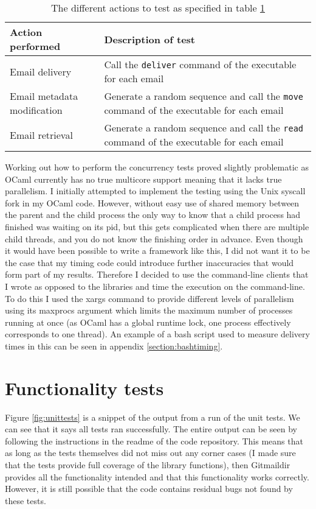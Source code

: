 \begin{table}[h]
\footnotesize
\centering
\begin{tabular}{p{4cm} p{10.5cm}}
  \toprule
  Action performed & Description of test \\
  \midrule
  Email delivery & Call the \texttt{deliver} command of the executable for each email \\
  Email metadata modification & Generate a random sequence and call the \texttt{move} command of the executable for each email \\
  Email retrieval & Generate a random sequence and call the \texttt{read} command of the executable for each email \\
  \bottomrule
\end{tabular}
\caption{The different actions to test as specified in table \ref{table:actions}}
\label{table:actions}
\end{table}

Working out how to perform the concurrency tests proved slightly problematic as OCaml currently has no true multicore support meaning that it lacks true parallelism. I initially attempted to implement the testing using the Unix syscall fork in my OCaml code. However, without easy use of shared memory between the parent and the child process the only way to know that a child process had finished was waiting on its pid, but this gets complicated when there are multiple child threads, and you do not know the finishing order in advance. Even though it would have been possible to write a framework like this, I did not want it to be the case that my timing code could introduce further inaccuracies that would form part of my results. Therefore I decided to use the command-line clients that I wrote as opposed to the libraries and time the execution on the command-line. To do this I used the xargs command to provide different levels of parallelism using its maxprocs argument which limits the maximum number of processes running at once (as OCaml has a global runtime lock, one process effectively corresponds to one thread). An example of a bash script used to measure delivery times in this can be seen in appendix \ref{section:bashtiming}.

\section{Functionality tests} \label{section:functionality_tests}

Figure \ref{fig:unittests} is a snippet of the output from a run of the unit tests. We can see that it says all tests ran successfully. The entire output can be seen by following the instructions in the readme of the code repository. This means that as long as the tests themselves did not miss out any corner cases (I made sure that the tests provide full coverage of the library functions), then Gitmaildir provides all the functionality intended and that this functionality works correctly. However, it is still possible that the code contains residual bugs not found by these tests.

